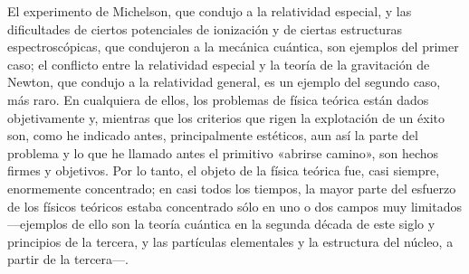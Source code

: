 \documentclass[a4paper, 12pt]{article}
\begin{document}
{El experimento de Michelson, que condujo a la relatividad especial, y las dificultades de ciertos potenciales de ionización y de ciertas estructuras espectroscópicas, que condujeron a la mecánica cuántica, son ejemplos del primer caso; el conflicto entre la relatividad especial y la teoría de la gravitación de Newton, que condujo a la relatividad general, es un ejemplo del segundo caso, más raro. En cualquiera de ellos, los problemas de física teórica están dados objetivamente y, mientras que los criterios que rigen la explotación de un éxito son, como he indicado antes, principalmente estéticos, aun así la parte del problema y lo que he llamado antes el primitivo «abrirse camino», son hechos firmes y objetivos. Por lo tanto, el objeto de la física teórica fue, casi siempre, enormemente concentrado; en casi todos los tiempos, la mayor parte del esfuerzo de los físicos teóricos estaba concentrado sólo en uno o dos campos muy limitados ---ejemplos de ello son la teoría cuántica en la segunda década de este siglo y principios de la tercera, y las partículas elementales y la estructura del núcleo, a partir de la tercera---.

}
\end{document}
